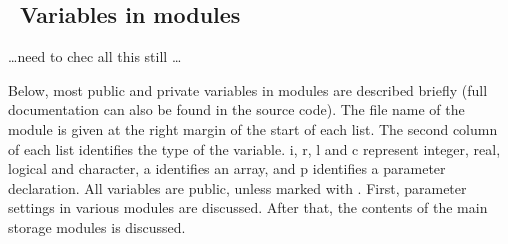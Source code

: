 \vsssub
\subsection{~Variables in modules} \label{sec:variables}
\vsssub

\centerline{\ldots need to chec all this still \ldots}
\vspace{\baselineskip}
\noindent
Below, most {\F public} and {\F private} variables in modules are described
briefly (full documentation can also be found in the source code). The file
name of the module is given at the right margin of the start of each list. The
second column of each list identifies the type of the variable. {\F i}, {\F
  r}, {\F l} and {\F c} represent integer, real, logical and character, {\F a}
identifies an array, and{ \F p} identifies a {\F parameter} declaration. All
variables are public, unless marked with \opt. First, parameter settings in
various modules are discussed. After that, the contents of the main storage
modules is discussed.
